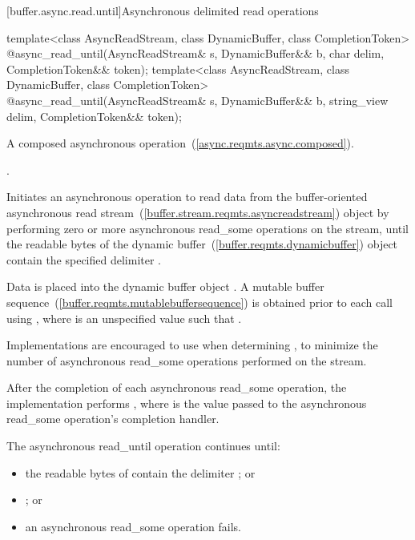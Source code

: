 [buffer.async.read.until]{Asynchronous delimited read operations}

%
\begin{itemdecl}
template<class AsyncReadStream, class DynamicBuffer, class CompletionToken>
  @\DEDUCED@ async_read_until(AsyncReadStream& s,
                           DynamicBuffer&& b, char delim,
                           CompletionToken&& token);
template<class AsyncReadStream, class DynamicBuffer, class CompletionToken>
  @\DEDUCED@ async_read_until(AsyncReadStream& s,
                           DynamicBuffer&& b, string_view delim,
                           CompletionToken&& token);
\end{itemdecl}

\begin{itemdescr}
\pnum
A composed asynchronous operation~(\ref{async.reqmts.async.composed}).

\pnum
\completionsig {}.

\pnum
\effects Initiates an asynchronous operation to read data from the buffer-oriented asynchronous read stream~(\ref{buffer.stream.reqmts.asyncreadstream}) object  by performing zero or more asynchronous read_some operations on the stream, until the readable bytes of the dynamic buffer~(\ref{buffer.reqmts.dynamicbuffer}) object  contain the specified delimiter .

\pnum
Data is placed into the dynamic buffer object . A mutable buffer sequence~(\ref{buffer.reqmts.mutablebuffersequence}) is obtained prior to each  call using , where  is an unspecified value such that . \begin{note} Implementations are encouraged to use  when determining , to minimize the number of asynchronous read_some operations performed on the stream. \end{note} After the completion of each asynchronous read_some operation, the implementation performs , where  is the value passed to the asynchronous read_some operation's completion handler.

\pnum
The asynchronous read_until operation continues until:

\begin{itemize}
\item
the readable bytes of  contain the delimiter ; or
\item
{}; or
\item
an asynchronous read_some operation fails.
\end{itemize}


\end{itemdescr}
